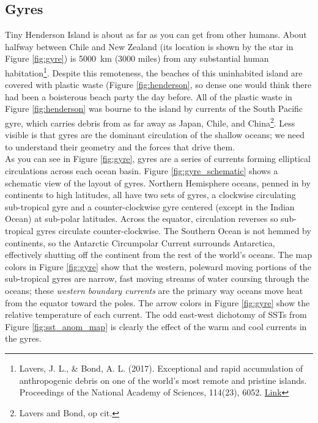 {\subsection{Gyres}\label{gyres}
Tiny Henderson Island is about as far as you can get from other humans. About halfway between Chile and New Zealand (its location is shown by the star in Figure \ref{fig:gyre}) is \SI{5000}{\kilo\metre} (3000 miles) from any substantial human habitation\footnote{Lavers, J. L., \& Bond, A. L. (2017). Exceptional and rapid accumulation of anthropogenic debris on one of the world's most remote and pristine islands. Proceedings of the National Academy of Sciences, 114(23), 6052. \href{https://doi.org/10.1073/pnas.1619818114}{Link}}. Despite this remoteness, the beaches of this uninhabited island are covered with plastic waste (Figure \ref{fig:henderson}, so dense one would think there had been a boisterous beach party the day before. All of the plastic waste in Figure \ref{fig:henderson} was bourne to the island by currents of the South Pacific gyre, which carries debris from as far away as Japan, Chile, and China\footnote{Lavers and Bond, op cit.}. Less visible is that gyres are the dominant circulation of the shallow oceans; we need to understand their geometry and the forces that drive them.\\
As you can see in Figure \ref{fig:gyre}, gyres are a series of currents forming elliptical circulations across each ocean basin. Figure \ref{fig:gyre_schematic} shows a schematic view of the layout of gyres. Northern Hemisphere oceans, penned in by continents to high latitudes, all have two sets of gyres, a clockwise circulating sub-tropical gyre and a counter-clockwise gyre centered (except in the Indian Ocean) at sub-polar latitudes. Across the equator, circulation reverses so sub-tropical gyres circulate counter-clockwise. The Southern Ocean is not hemmed by continents, so the Antarctic Circumpolar Current surrounds Antarctica, effectively shutting off the continent from the rest of the world's oceans. The map colors in Figure \ref{fig:gyre} show that the western, poleward moving portions of the sub-tropical gyres are narrow, fast moving streams of water coursing through the oceans; these \emph{western boundary currents} are the primary way oceans move heat from the equator toward the poles. The arrow colors in Figure \ref{fig:gyre} show the relative temperature of each current. The odd east-west dichotomy of SSTs from Figure \ref{fig:sst_anom_map} is clearly the effect of the warm and cool currents in the gyres.\\

}
